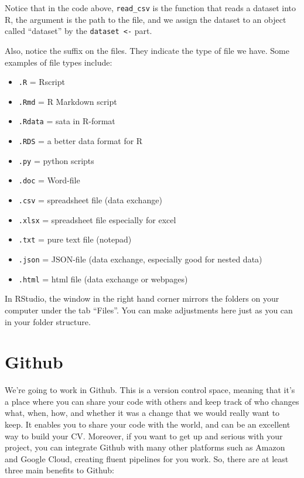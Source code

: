 \documentclass[
]{article}
\providecommand{\tightlist}{%
  \setlength{\itemsep}{0pt}\setlength{\parskip}{0pt}}
\begin{document}
Notice that in the code above, \texttt{read\_csv} is the function that
reads a dataset into R, the argument is the path to the file, and we
assign the dataset to an object called ``dataset'' by the
\texttt{dataset\ \textless{}-} part.

Also, notice the suffix on the files. They indicate the type of file we
have. Some examples of file types include:

\begin{itemize}
\tightlist
\item
  \texttt{.R} = Rscript
\item
  \texttt{.Rmd} = R Markdown script
\item
  \texttt{.Rdata} = sata in R-format
\item
  \texttt{.RDS} = a better data format for R
\item
  \texttt{.py} = python scripts
\item
  \texttt{.doc} = Word-file
\item
  \texttt{.csv} = spreadsheet file (data exchange)
\item
  \texttt{.xlsx} = spreadsheet file especially for excel
\item
  \texttt{.txt} = pure text file (notepad)
\item
  \texttt{.json} = JSON-file (data exchange, especially good for nested
  data)
\item
  \texttt{.html} = html file (data exchange or webpages)
\end{itemize}

In RStudio, the window in the right hand corner mirrors the folders on
your computer under the tab ``Files''. You can make adjustments here
just as you can in your folder structure.

\hypertarget{github}{%
\section{Github}\label{github}}

We're going to work in Github. This is a version control space, meaning
that it's a place where you can share your code with others and keep
track of who changes what, when, how, and whether it was a change that
we would really want to keep. It enables you to share your code with the
world, and can be an excellent way to build your CV. Moreover, if you
want to get up and serious with your project, you can integrate Github
with many other platforms such as Amazon and Google Cloud, creating
fluent pipelines for you work. So, there are at least three main
benefits to Github:
\end{document}
